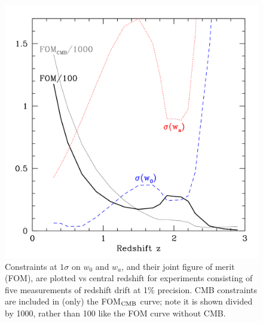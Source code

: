 \documentclass[preprint2, 10pt]{aastex}
\begin{document}
\begin{figure}[!htbp] 
   \centering
  \includegraphics[width=\columnwidth]{fomcmb.pdf}
\caption{Constraints at $1\sigma$ on $w_0$ and $w_a$, and their joint 
figure of merit (FOM), are plotted vs central redshift for experiments 
consisting of five measurements of redshift drift at 1\% precision. 
CMB constraints are included in (only) the FOM$_{\rm CMB}$ curve; 
note it is shown divided by 1000, rather than 100 like 
the FOM curve without CMB. 
} 
\label{fig:fom} 
\end{figure}
\end{document}
